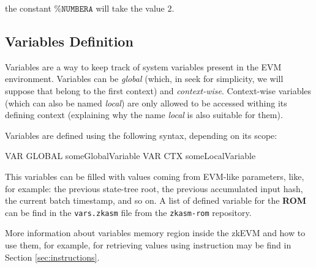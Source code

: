 the constant $\texttt{\%}\mathtt{NUMBERA}$ will take the value $2$.



\subsection{Variables Definition}

Variables are a way to keep track of system variables present in the EVM environment. Variables can be \textit{global} (which, in seek for simplicity, we will suppose that belong to the first context) and \textit{context-wise}. Context-wise variables (which can also be named \textit{local}) are only allowed to be accessed withing its defining context (explaining why the name \textit{local} is also suitable for them). 

Variables are defined using the following syntax, depending on its scope:

\begin{zkasm}
VAR GLOBAL someGlobalVariable
VAR CTX someLocalVariable
\end{zkasm}

This variables can be filled with values coming from EVM-like parameters, like, for example: the previous state-tree root, the previous accumulated input hash, the current batch timestamp, and so on. A list of defined variable for the \textbf{ROM} can be find in the \texttt{vars.zkasm} file from the \texttt{zkasm-rom} repository. 

More information about variables memory region inside the zkEVM and how to use them, for example, for retrieving values using \MLOAD instruction may be find in Section \ref{sec:instructions}.


